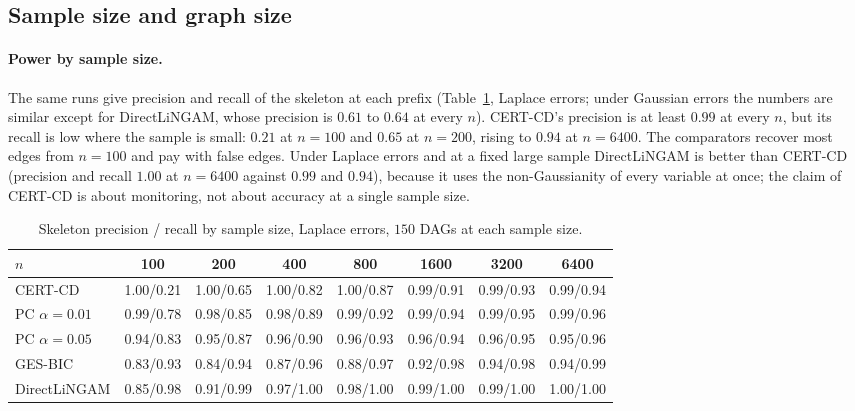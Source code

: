 \subsection{Sample size and graph size}\label{sec:exp-scaling}

\paragraph{Power by sample size.} The same runs give precision and recall of the
skeleton at each prefix (Table~\ref{tab:byn}, Laplace errors; under Gaussian errors
the numbers are similar except for DirectLiNGAM, whose precision is $0.61$ to $0.64$
at every $n$). CERT-CD's precision is at least $0.99$ at every $n$, but its recall
is low where the sample is small: $0.21$ at $n=100$ and $0.65$ at $n=200$,
rising to $0.94$ at $n=6400$. The comparators recover most edges from $n=100$
and pay with false edges. Under Laplace errors and at a fixed large sample DirectLiNGAM is better
than CERT-CD (precision and recall $1.00$ at $n=6400$ against
$0.99$ and $0.94$), because it uses the non-Gaussianity of every variable at
once; the claim of CERT-CD is about monitoring, not about accuracy at a single
sample size.

\begin{table}[t]
\caption{Skeleton precision / recall by sample size, Laplace errors, $150$ DAGs
at each sample size.}\label{tab:byn}
\small
\scriptsize\setlength{\tabcolsep}{2pt}
\begin{tabular}{@{}lccccccc@{}}
\toprule
$n$ & 100 & 200 & 400 & 800 & 1600 & 3200 & 6400\\
\midrule
CERT-CD & 1.00/0.21 & 1.00/0.65 & 1.00/0.82 & 1.00/0.87 & 0.99/0.91 & 0.99/0.93 & 0.99/0.94\\
PC $\alpha=0.01$ & 0.99/0.78 & 0.98/0.85 & 0.98/0.89 & 0.99/0.92 & 0.99/0.94 & 0.99/0.95 & 0.99/0.96\\
PC $\alpha=0.05$ & 0.94/0.83 & 0.95/0.87 & 0.96/0.90 & 0.96/0.93 & 0.96/0.94 & 0.96/0.95 & 0.95/0.96\\
GES-BIC & 0.83/0.93 & 0.84/0.94 & 0.87/0.96 & 0.88/0.97 & 0.92/0.98 & 0.94/0.98 & 0.94/0.99\\
DirectLiNGAM & 0.85/0.98 & 0.91/0.99 & 0.97/1.00 & 0.98/1.00 & 0.99/1.00 & 0.99/1.00 & 1.00/1.00\\
\bottomrule
\end{tabular}
\end{table}

